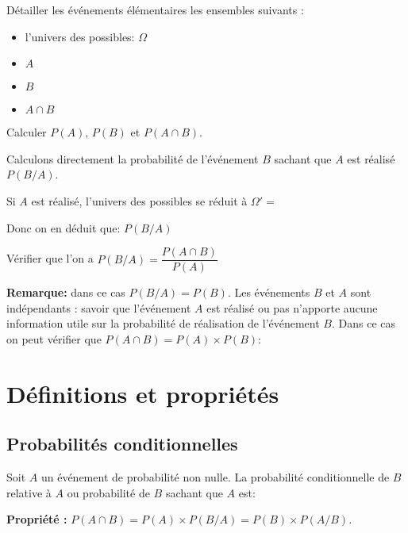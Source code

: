 \documentclass[a4paper,12pt]{scrartcl}
\begin{document}
Détailler les événements élémentaires les ensembles suivants : 	

\begin{itemize}
\item l'univers des possibles: $\Omega$
\item $A$
\item $B$
\item $A \cap B$
\end{itemize}


Calculer $P(A)$, $P(B)$ et $P(A \cap B)$.


Calculons directement la probabilité de l’événement $B$ sachant que $A$ est réalisé $P(B/A)$. 

Si $A$ est réalisé, l'univers des possibles se réduit à $\Omega' = $


Donc on en déduit que: $P(B/A)$ 


Vérifier que l’on a $P(B/A) = \dfrac{P(A \cap B)}{P(A)}$


\textbf{Remarque:} dans ce cas $P(B/A) = P(B)$. Les événements $B$ et $A$ sont indépendants : savoir que l’événement $A$ est réalisé ou pas n’apporte aucune information utile sur la probabilité de réalisation de l’événement $B$. Dans ce cas on peut vérifier que $P(A \cap B) = P(A) \times P(B)$:


\section{Définitions et propriétés}

\subsection{Probabilités conditionnelles}

\begin{definition}

Soit $A$ un événement de probabilité non nulle. La probabilité conditionnelle de $B$ relative à $A$ ou probabilité de $B$ sachant que $A$ est:

 
\end{definition}

\textbf{Propriété :} $P(A \cap B) = P(A) \times P(B/A) = P(B) \times P(A/B)$. 
\end{document}
